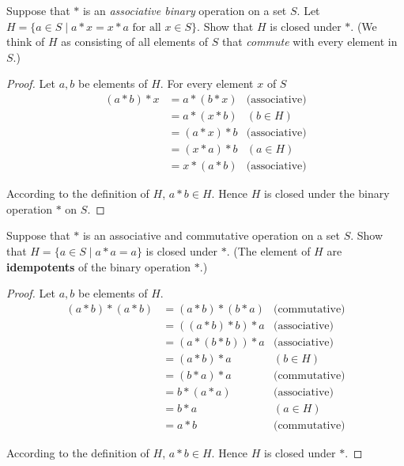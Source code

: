 \newpage
\begin{exercise}
    Suppose that $*$ is an \textit{associative binary} operation on a set $S$. Let $H = \{ a \in S \mid a * x = x * a \text{ for all } x\in S \}$. Show that $H$ is closed under $*$. (We think of $H$ as consisting of all elements of $S$ that \textit{commute} with every element in $S$.)
\end{exercise}

\begin{proof}
    Let $a, b$ be elements of $H$. For every element $x$ of $S$
    \begin{align*}
        (a * b) * x & = a * (b * x) & \text{(associative)} \\
                    & = a * (x * b) & (b\in H)             \\
                    & = (a * x) * b & \text{(associative)} \\
                    & = (x * a) * b & (a\in H)             \\
                    & = x * (a * b) & \text{(associative)}
    \end{align*}

    According to the definition of $H$, $a * b\in H$. Hence $H$ is closed under the binary operation $*$ on $S$.
\end{proof}

\newpage
\begin{exercise}
    Suppose that $*$ is an associative and commutative operation on a set $S$. Show that $H = \{ a\in S \mid a * a = a \}$ is closed under $*$. (The element of $H$ are \textbf{idempotents} of the binary operation $*$.)
\end{exercise}

\begin{proof}
    Let $a, b$ be elements of $H$.
    \begin{align*}
        (a * b) * (a * b) & = (a * b) * (b * a) & \text{(commutative)} \\
                          & = ((a * b) * b) * a & \text{(associative)} \\
                          & = (a * (b * b)) * a & \text{(associative)} \\
                          & = (a * b) * a       & (b\in H)             \\
                          & = (b * a) * a       & \text{(commutative)} \\
                          & = b * (a * a)       & \text{(associative)} \\
                          & = b * a             & (a\in H)             \\
                          & = a * b             & \text{(commutative)}
    \end{align*}

    According to the definition of $H$, $a * b\in H$. Hence $H$ is closed under $*$.
\end{proof}

